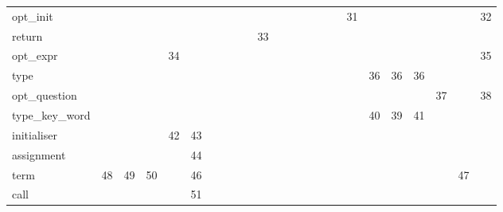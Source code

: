 \begin{table}[htbp]
\begin{tabular}{l|ccccccccccccccccccccccc}
opt\_init                   &                   &          &          &      &    &       &       &         &      &          &        &      &     &                    &      &     & 31  &       &          &          &     &       & 32      \\
return                      &                   &          &          &      &    &       &       &         &      & 33       &        &      &     &                    &      &     &     &       &          &          &     &       &         \\
opt\_expr                   &                   &          &          & 34   &    &       &       &         &      &          &        &      &     &                    &      &     &     &       &          &          &     &       & 35      \\
type                        &                   &          &          &      &    &       &       &         &      &          &        &      &     &                    &      &     &     & 36    & 36       & 36       &     &       &         \\
opt\_question               &                   &          &          &      &    &       &       &         &      &          &        &      &     &                    &      &     &     &       &          &          & 37  &       & 38      \\
type\_key\_word             &                   &          &          &      &    &       &       &         &      &          &        &      &     &                    &      &     &     & 40    & 39       & 41       &     &       &         \\
initialiser                 &                   &          &          & 42   & 43 &       &       &         &      &          &        &      &     &                    &      &     &     &       &          &          &     &       &         \\
assignment                  &                   &          &          &      & 44 &       &       &         &      &          &        &      &     &                    &      &     &     &       &          &          &     &       &         \\
term                        & 48                & 49       & 50       &      & 46 &       &       &         &      &          &        &      &     &                    &      &     &     &       &          &          &     & 47    &         \\
call                        &                   &          &          &      & 51 &       &       &         &      &          &        &      &     &                    &      &     &     &       &          &          &     &       &         \\

\end{tabular}
\end{table}
